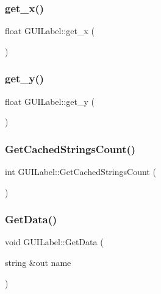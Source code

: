 \hypertarget{class_g_u_i_label_ae6fe682d14ac2d4a70f3b1c85080608d}{}\label{class_g_u_i_label_ae6fe682d14ac2d4a70f3b1c85080608d} 
\subsubsection{\texorpdfstring{get\+\_\+x()}{get\_x()}}
{\footnotesize\ttfamily float G\+U\+I\+Label\+::get\+\_\+x (\begin{DoxyParamCaption}{ }\end{DoxyParamCaption})}

\hypertarget{class_g_u_i_label_a9cb4a285368e8a93c6d1d063f60a445f}{}\label{class_g_u_i_label_a9cb4a285368e8a93c6d1d063f60a445f} 
\subsubsection{\texorpdfstring{get\+\_\+y()}{get\_y()}}
{\footnotesize\ttfamily float G\+U\+I\+Label\+::get\+\_\+y (\begin{DoxyParamCaption}{ }\end{DoxyParamCaption})}

\hypertarget{class_g_u_i_label_a67a8d240c2c8c2434f40e12e12390c0d}{}\label{class_g_u_i_label_a67a8d240c2c8c2434f40e12e12390c0d} 
\subsubsection{\texorpdfstring{Get\+Cached\+Strings\+Count()}{GetCachedStringsCount()}}
{\footnotesize\ttfamily int G\+U\+I\+Label\+::\+Get\+Cached\+Strings\+Count (\begin{DoxyParamCaption}{ }\end{DoxyParamCaption})}

\hypertarget{class_g_u_i_label_aeb42efa58eefc6933b83d694ef5ceaf8}{}\label{class_g_u_i_label_aeb42efa58eefc6933b83d694ef5ceaf8} 
\subsubsection{\texorpdfstring{Get\+Data()}{GetData()}}
{\footnotesize\ttfamily void G\+U\+I\+Label\+::\+Get\+Data (\begin{DoxyParamCaption}\item[{string \&out}]{name }\end{DoxyParamCaption})}

